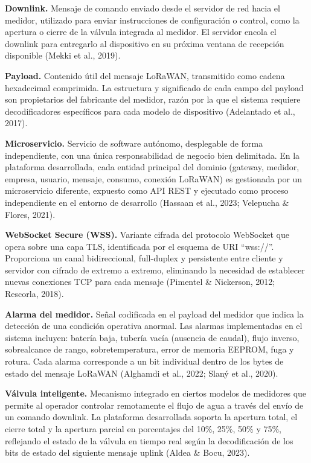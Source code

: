 \documentclass[12pt,a4paper,oneside]{report}
\begin{document}
\textbf{Downlink.} Mensaje de comando enviado desde el servidor de red hacia el medidor, utilizado para enviar instrucciones de configuración o control, como la apertura o cierre de la válvula integrada al medidor. El servidor encola el downlink para entregarlo al dispositivo en su próxima ventana de recepción disponible (Mekki et al., 2019).

\textbf{Payload.} Contenido útil del mensaje LoRaWAN, transmitido como cadena hexadecimal comprimida. La estructura y significado de cada campo del payload son propietarios del fabricante del medidor, razón por la que el sistema requiere decodificadores específicos para cada modelo de dispositivo (Adelantado et al., 2017).

\textbf{Microservicio.} Servicio de software autónomo, desplegable de forma independiente, con una única responsabilidad de negocio bien delimitada. En la plataforma desarrollada, cada entidad principal del dominio (gateway, medidor, empresa, usuario, mensaje, consumo, conexión LoRaWAN) es gestionada por un microservicio diferente, expuesto como API REST y ejecutado como proceso independiente en el entorno de desarrollo (Hassaan et al., 2023; Velepucha \& Flores, 2021).

\textbf{WebSocket Secure (WSS).} Variante cifrada del protocolo WebSocket que opera sobre una capa TLS, identificada por el esquema de URI ``wss://''. Proporciona un canal bidireccional, full-duplex y persistente entre cliente y servidor con cifrado de extremo a extremo, eliminando la necesidad de establecer nuevas conexiones TCP para cada mensaje (Pimentel \& Nickerson, 2012; Rescorla, 2018).

\textbf{Alarma del medidor.} Señal codificada en el payload del medidor que indica la detección de una condición operativa anormal. Las alarmas implementadas en el sistema incluyen: batería baja, tubería vacía (ausencia de caudal), flujo inverso, sobrealcance de rango, sobretemperatura, error de memoria EEPROM, fuga y rotura. Cada alarma corresponde a un bit individual dentro de los bytes de estado del mensaje LoRaWAN (Alghamdi et al., 2022; Slaný et al., 2020).

\textbf{Válvula inteligente.} Mecanismo integrado en ciertos modelos de medidores que permite al operador controlar remotamente el flujo de agua a través del envío de un comando downlink. La plataforma desarrollada soporta la apertura total, el cierre total y la apertura parcial en porcentajes del 10\%, 25\%, 50\% y 75\%, reflejando el estado de la válvula en tiempo real según la decodificación de los bits de estado del siguiente mensaje uplink (Aldea \& Bocu, 2023).
\end{document}
